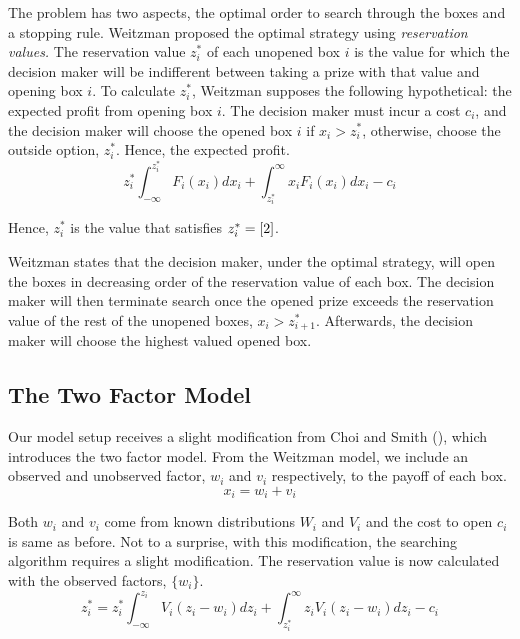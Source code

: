 \documentclass[12pt]{article}
\begin{document}
The problem has two aspects, the optimal order to search through the boxes and a stopping rule. Weitzman proposed the optimal strategy using \textit{reservation values.} The reservation value \(z_i^\ast\) of each unopened box \(i\) is the value for which the decision maker will be indifferent between taking a prize with that value and opening box \(i\). To calculate \(z_i^\ast\), Weitzman supposes the following hypothetical: the expected profit from opening box \(i\). The decision maker must incur a cost \(c_i\), and the decision maker will choose the opened box \(i\) if \(x_i>z_i^\ast\), otherwise, choose the outside option, \(z_i^\ast\). Hence, the expected profit.
\begin{equation}\label{2}
    z_i^\ast\int_{-\infty}^{z_i^\ast}F_i(x_i)dx_i+\int_{z_i^\ast}^\infty x_i F_i(x_i)dx_i-c_i
\end{equation}

Hence, \(z_i^\ast\) is the value that satisfies \(z_i^\ast=\eqref{2}\).

Weitzman states that the decision maker, under the optimal strategy, will open the boxes in decreasing order of the reservation value of each box. The decision maker will then terminate search once the opened prize exceeds the reservation value of the rest of the unopened boxes, \(x_i>z_{i+1}^\ast\). Afterwards, the decision maker will choose the highest valued opened box.

\subsection{The Two Factor Model}
Our model setup receives a slight modification from Choi and Smith (\citeyear{Choi}), which introduces the two factor model. From the Weitzman model, we include an observed and unobserved factor, \(w_i\) and \(v_i\) respectively, to the payoff of each box.
\begin{equation}
    x_i=w_i+v_i
\end{equation}

Both \(w_i\) and \(v_i\) come from known distributions \(W_i\) and \(V_i\) and the cost to open \(c_i\) is same as before. Not to a surprise, with this modification, the searching algorithm requires a slight modification. The reservation value is now calculated with the observed factors, \(\{w_i\}\).
\begin{equation}
    z_i^\ast=z_i^\ast\int_{-\infty}^{z_i}V_i(z_i-w_i)dz_i+\int_{z_i^\ast}^\infty z_i V_i(z_i-w_i)dz_i-c_i
\end{equation}
\end{document}
